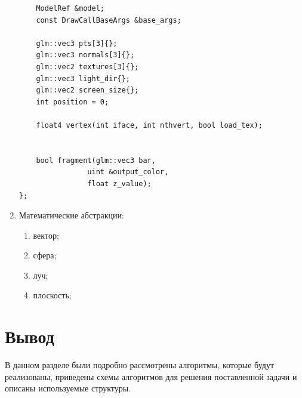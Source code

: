 \begin{enumerate}
\begin{Verbatim}
	ModelRef &model;
	const DrawCallBaseArgs &base_args;

	glm::vec3 pts[3]{};
	glm::vec3 normals[3]{};
	glm::vec2 textures[3]{};
	glm::vec3 light_dir{};
	glm::vec2 screen_size{};
	int position = 0;

	float4 vertex(int iface, int nthvert, bool load_tex);


	bool fragment(glm::vec3 bar,
	 			uint &output_color,
				float z_value);
};
	\end{Verbatim}
	\item Математические абстракции:
	\begin{enumerate}
		\item вектор;
		\item сфера;
		\item луч;
		\item плоскость;
	\end{enumerate}
\end{enumerate}


\section*{Вывод}
В данном разделе были подробно рассмотрены алгоритмы, которые будут реализованы, приведены схемы алгоритмов для решения поставленной задачи и описаны используемые структуры.
